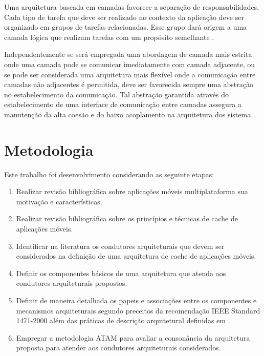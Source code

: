 \documentclass[
	article,			%
	11pt,				%
	oneside,			%
	a4paper,			%
	english,			%
	brazil,				%
	sumario=tradicional
]{abntex2}
\begin{document}
Uma arquitetura baseada em camadas favorece a separação de responsabilidades. Cada tipo de tarefa que deve ser realizado no contexto da aplicação deve ser organizado em grupos de tarefas relacionadas. Esse grupo dará origem a uma camada lógica que realizam tarefas com um propósito semelhante \cite{meier2009microsoft}. 

Independentemente se será empregada uma abordagem de camada mais estrita onde uma camada pode se comunicar imediatamente com camada adjacente, ou se pode ser considerada uma arquitetura mais flexível onde a comunicação entre camadas não adjacentes é permitida, deve ser favorecida sempre uma abstração no estabelecimento da comunicação. Tal abstração garantida através do estabelecimento de uma interface de comunicação entre camadas assegura a manutenção da alta coesão e do baixo acoplamento na arquitetura dos sistema \cite{meier2009microsoft}.

\chapter{Metodologia}
Este trabalho foi desenvolvimento considerando as seguinte etapas:

\begin{enumerate}
	
	\item Realizar revisão bibliográfica sobre aplicações móveis multiplataforma sua motivação e características.
	
	\item Realizar revisão bibliográfica sobre os princípios e técnicas de cache de aplicações móveis.
	
	\item Identificar na literatura os condutores arquiteturais que devem ser considerados na definição de uma arquitetura de cache de aplicações móveis.
	
	\item Definir os componentes básicos de uma arquitetura que atenda aos condutores arquiteturais propostos.
	
	\item Definir de maneira detalhada os papeis e associações entre os componentes e mecanismos arquiteturais segundo preceitos da recomendação IEEE Standard 1471-2000 além das práticas de descrição arquitetural definidas em \cite{bass2012practice}\cite{bachmann2010DocumentingSoftware}.
	
	\item Empregar a metodologia ATAM para avaliar a consonância da arquitetura proposta para atender aos condutores arquiteturais considerados.
\end{enumerate}
\end{document}
